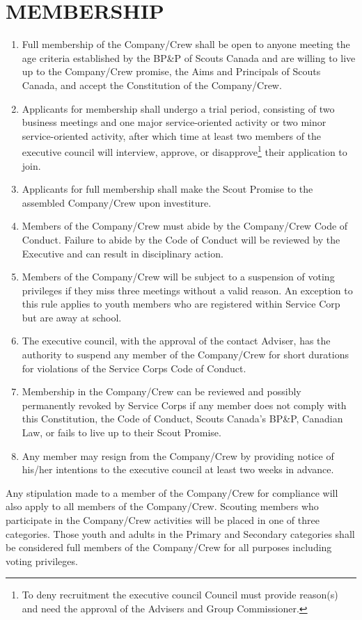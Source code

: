 \documentclass{Service_Corps_Document}
\begin{document}
\section{MEMBERSHIP}
\begin{enumerate}
	\item Full membership of the Company/Crew shall be open to anyone meeting the age criteria established by the BP\&P of Scouts Canada and are willing to live up to the Company/Crew promise, the Aims and Principals of Scouts Canada, and accept the Constitution of the Company/Crew. 
	\item Applicants for membership shall undergo a trial period, consisting of two business meetings and one major service-oriented activity or two minor service-oriented activity, after which time at least two members of the executive council will interview, approve, or disapprove\footnote{To deny recruitment the executive council Council must provide reason(s) and need the approval of the Advisers and Group Commissioner.} their application to join.
	\item Applicants for full membership shall make the Scout Promise to the assembled Company/Crew upon investiture. 
	\item Members of the Company/Crew must abide by the Company/Crew Code of Conduct. Failure to abide by the Code of Conduct will be reviewed by the Executive and can result in disciplinary action. 
	\item Members of the Company/Crew will be subject to a suspension of voting privileges if they miss three meetings without a valid reason. An exception to this rule applies to youth members who are registered within Service Corp but are away at school.
	\item The executive council, with the approval of the contact Adviser, has the authority to suspend any member of the Company/Crew for short durations for violations of the Service Corps Code of Conduct. 
	\item Membership in the Company/Crew can be reviewed and possibly permanently revoked by Service Corps if any member does not comply with this Constitution, the Code of Conduct, Scouts Canada's BP\&P, Canadian Law, or fails to live up to their Scout Promise.
	\item Any member may resign from the Company/Crew by providing notice of his/her intentions to the executive council at least two weeks in advance.
\end{enumerate}
Any stipulation made to a member of the Company/Crew for compliance will also apply to all members of the Company/Crew. 
Scouting members who participate in the Company/Crew activities will be placed in one of three categories. Those youth and adults in the Primary and Secondary categories shall be considered full members of the Company/Crew for all purposes including voting privileges. 
\end{document}

